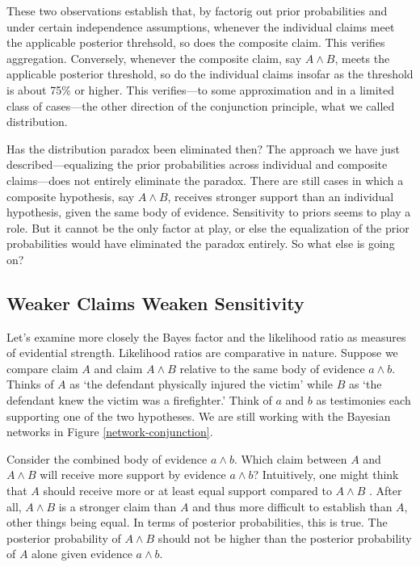 \documentclass[
  10pt,
  dvipsnames,enabledeprecatedfontcommands]{scrartcl}
\begin{document}
These two observations establish that, by factorig out prior
probabilities and under certain independence assumptions, whenever the
individual claims meet the applicable posterior threhsold, so does the
composite claim. This verifies aggregation. Conversely, whenever the
composite claim, say \(A \wedge B\), meets the applicable posterior
threshold, so do the individual claims insofar as the threshold is about
75\% or higher. This verifies---to some approximation and in a limited
class of cases---the other direction of the conjunction principle, what
we called distribution.

Has the distribution paradox been eliminated then? The approach we have
just described---equalizing the prior probabilities across individual
and composite claims---does not entirely eliminate the paradox. There
are still cases in which a composite hypothesis, say \(A \wedge B\),
receives stronger support than an individual hypothesis, given the same
body of evidence. Sensitivity to priors seems to play a role. But it
cannot be the only factor at play, or else the equalization of the prior
probabilities would have eliminated the paradox entirely. So what else
is going on?

\hypertarget{weaker-claims-weaken-sensitivity}{%
\subsection{Weaker Claims Weaken
Sensitivity}\label{weaker-claims-weaken-sensitivity}}

Let's examine more closely the Bayes factor and the likelihood ratio as
measures of evidential strength. Likelihood ratios are comparative in
nature. Suppose we compare claim \(A\) and claim \(A\wedge B\) relative
to the same body of evidence \(a\wedge b\). Thinks of \(A\) as `the
defendant physically injured the victim' while \(B\) as `the defendant
knew the victim was a firefighter.' Think of \(a\) and \(b\) as
testimonies each supporting one of the two hypotheses. We are still
working with the Bayesian networks in Figure \ref{network-conjunction}.

Consider the combined body of evidence \(a\wedge b\). Which claim
between \(A\) and \(A\wedge B\) will receive more support by evidence
\(a\wedge b\)? Intuitively, one might think that \(A\) should receive
more or at least equal support compared to \(A\wedge B\) . After all,
\(A\wedge B\) is a stronger claim than \(A\) and thus more difficult to
establish than \(A\), other things being equal. In terms of posterior
probabilities, this is true. The posterior probability of \(A\wedge B\)
should not be higher than the posterior probability of \(A\) alone given
evidence \(a \wedge b\).
\end{document}
